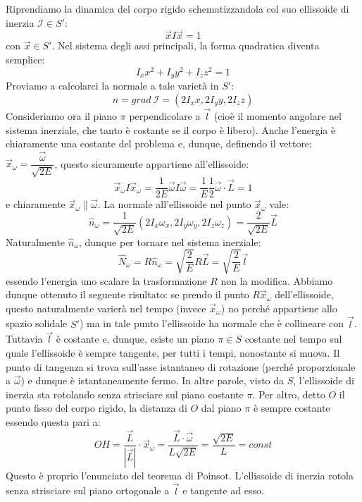 \documentclass[a4paper,openany]{article}
\begin{document}
	Riprendiamo la dinamica del corpo rigido schematizzandola col suo ellissoide di inerzia $\mathcal{I}\in S'$:
	$$
	\vec{x}I\vec{x} = 1
	$$
	con $\vec{x}\in S'$. Nel sistema degli assi principali, la forma quadratica diventa semplice:
	$$
	I_x x^2 + I_y y^2 + I_z z^2  = 1
	$$
	Proviamo a calcolarci la normale a tale varietà in $S'$:
	$$
	\hat{n} = grad\>\mathcal{I} = (2I_x x,2I_y y,2I_z z)
	$$
	Consideriamo ora il piano $\pi$ perpendicolare a $\vec{l}$ (cioè il momento angolare nel sistema inerziale, che tanto è costante se il corpo è libero). Anche l'energia è chiaramente una costante del problema e, dunque, definendo il vettore:
	$\vec{x}_{\omega} = \dfrac{\vec{\omega}}{\sqrt{2E}} $, questo sicuramente appartiene all'ellissoide:
	$$
	\vec{x}_{\omega}I\vec{x}_{\omega} = \dfrac{1}{2E} \vec{\omega}I\vec{\omega} = \dfrac{1}{E} \dfrac{1}{2}\vec{\omega}\cdot\vec{L} = 1
	$$
	e chiaramente $\vec{x}_{\omega} \parallel \vec{\omega}$. La normale all'ellissoide nel punto $\vec{x}_{\omega}$ vale:
	$$
	\hat{n}_{\omega} =\dfrac{1}{\sqrt{2E}} (2I_x \omega_{x},2I_y \omega_y,2I_z \omega_z) = \dfrac{2}{\sqrt{2E}}\vec{L}
	$$
	Naturalmente $\hat{n}_{\omega}$, dunque per tornare nel sistema inerziale:
	$$
	\hat{N}_{\omega} = R\hat{n}_{\omega} =\sqrt{\dfrac{2}{E}}R\vec{L} = \sqrt{\dfrac{2}{E}}\vec{l}
	$$
	essendo l'energia uno scalare la trasformazione $R$ non la modifica. Abbiamo dunque ottenuto il seguente risultato: se prendo il punto $R\vec{x}_{\omega}$ dell'ellissoide, questo naturalmente varierà nel tempo (invece $\vec{x}_{\omega}$) no perché appartiene allo spazio solidale $S'$) ma in tale punto l'ellissoide ha normale che è collineare con $\vec{l}$. Tuttavia $\vec{l}$ è costante e, dunque, esiste un piano $\pi \in S$ costante nel tempo sul quale l'ellissoide è sempre tangente, per tutti i tempi, nonostante si muova. Il punto di tangenza si trova sull'asse istantaneo di rotazione (perché proporzionale a $\vec{\omega}$) e dunque è istantaneamente fermo. In altre parole, visto da $S$, l'ellissoide di inerzia sta rotolando senza strisciare sul piano costante $\pi$. Per altro, detto $O$ il punto fisso del corpo rigido, la distanza di $O$ dal piano $\pi$ è sempre costante essendo questa pari a:
	$$
	OH = \dfrac{\vec{L}}{|\vec{L}|}\cdot\vec{x}_{\omega} = \dfrac{\vec{L}\cdot\vec{\omega}}{L\sqrt{2E}} = \dfrac{\sqrt{2E}}{L} = const
	$$
	Questo è proprio l'enunciato del teorema di Poinsot. L'ellissoide di inerzia rotola senza strisciare sul piano ortogonale a $\vec{l}$ e tangente ad esso.
\end{document}
